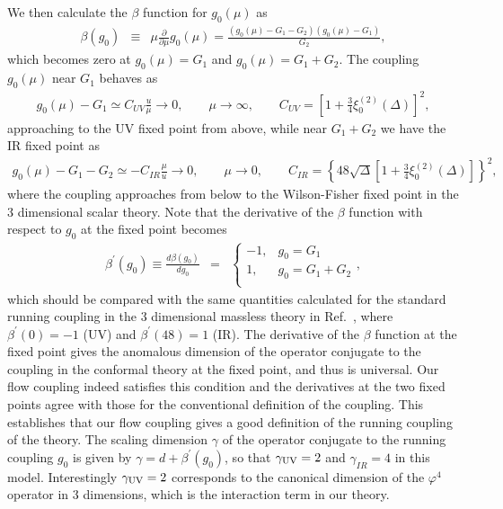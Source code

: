 \documentclass[preprint]{ptephy_v1}%
\begin{document}
We then calculate the $\beta$ function for $ g_0( \mu )$  as 
\begin{eqnarray}
\beta(g_0)&\equiv&\mu \frac{\partial }{\partial \mu} g_0(\mu) = \frac{(g_0(\mu) - G_1-G_2)(g_0(\mu) - G_1)}{G_2}, 
\end{eqnarray}
which becomes zero at $g_0(\mu) =G_1$ and $g_0(\mu) =G_1+G_2$.
The coupling  $g_0(\mu)$ near  $G_1$ behaves as 
\begin{eqnarray}
g_0(\mu) - G_1 \simeq C_{UV} \frac{u}{\mu} \rightarrow 0 , \qquad \mu\rightarrow \infty, \qquad
C_{UV} = \left[ 1 +\frac{3}{4}\xi_0^{(2)}(\Delta)\right]^2,
\end{eqnarray}
approaching to the UV fixed point from above, while  near $G_1+G_2$ we have the IR fixed point as 
\begin{eqnarray}
g_0(\mu) - G_1-G_2 \simeq - C_{IR} \frac{\mu}{u} \rightarrow 0 , \qquad \mu\rightarrow 0, \qquad
C_{IR} =\left\{48\sqrt{\Delta}  \left[ 1 +\frac{3}{4}\xi_0^{(2)}(\Delta)\right]\right\}^2,
\end{eqnarray}
where the coupling approaches from below to  the Wilson-Fisher fixed point in the 3 dimensional scalar theory.
Note that the derivative of the $\beta$ function with respect to $g_0$ at the fixed point becomes
\begin{eqnarray}
\beta^\prime(g_0) \equiv  \frac{d\beta(g_0)}{d g_0} &=& 
\left\{
\begin{array}{ll}
  -1, &  g_0=G_1     \\
  1, & g_0 = G_1+G_2    \\
\end{array}
\right. ,
\end{eqnarray}
which should be compared with the same quantities calculated for the standard running coupling in the 3 dimensional massless theory in Ref.~\cite{Aoki:2014yra}, where  $\beta^\prime (0) = -1$ (UV) and $\beta^\prime (48) = 1$ (IR). 
The derivative of the $\beta$ function at the fixed point gives the anomalous dimension of the operator conjugate to the coupling in the conformal theory at the fixed point, and thus is universal.
Our flow coupling indeed satisfies this condition and  the derivatives at the two fixed points agree with those for the conventional definition of the coupling.
This establishes that  our flow coupling gives a good definition of the running coupling of the theory.
 The scaling dimension $\gamma$ of the operator  conjugate to the running coupling $g_0$ is given by $\gamma=d+\beta^\prime(g_0)$, so that $\gamma_{\rm UV}= 2$ and $\gamma_{IR}=4$ in this model.
Interestingly $\gamma_{\rm UV}= 2$ corresponds to the canonical dimension of the $\varphi^4$ operator in 3 dimensions, which is  the interaction term in our theory.
\end{document}
